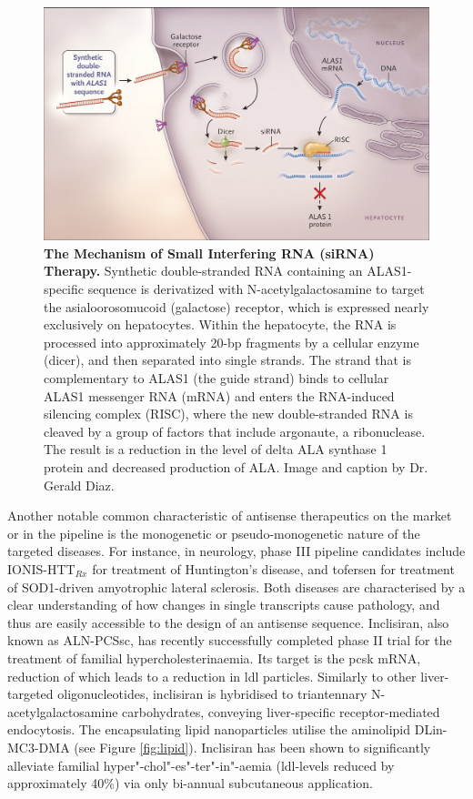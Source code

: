 \begin{figure}[ht]
\includegraphics[width=\textwidth]{figures/pathophys-porphyria-therapy-sirna-nejm-original}
\caption[The Mechanism of Small Interfering RNA (siRNA) Therapy.]{\textbf{The Mechanism of Small Interfering RNA (siRNA) Therapy.} Synthetic double-stranded RNA containing an ALAS1-specific sequence is derivatized with N-acetylgalactosamine to target the asialoorosomucoid (galactose) receptor, which is expressed nearly exclusively on hepatocytes. Within the hepatocyte, the RNA is processed into approximately 20-bp fragments by a cellular enzyme (dicer), and then separated into single strands. The strand that is complementary to ALAS1 (the guide strand) binds to cellular ALAS1 messenger RNA (mRNA) and enters the RNA-induced silencing complex (RISC), where the new double-stranded RNA is cleaved by a group of factors that include argonaute, a ribonuclease. The result is a reduction in the level of delta ALA synthase 1 protein and decreased production of ALA. Image and caption by Dr. Gerald Diaz.\cite{Diaz2018}
\label{fig:pathophys-porphyria}}
\end{figure}

Another notable common characteristic of antisense therapeutics on the market or in the pipeline is the monogenetic or pseudo-monogenetic nature of the targeted diseases. For instance, in neurology, phase III pipeline candidates include IONIS-HTT$_{Rx}$ for treatment of Huntington's disease, and tofersen for treatment of SOD1-driven amyotrophic lateral sclerosis. Both diseases are characterised by a clear understanding of how changes in single transcripts cause pathology, and thus are easily accessible to the design of an antisense sequence. Inclisiran, also known as ALN-PCSsc, has recently successfully completed phase II trial for the treatment of familial hypercholesterinaemia.\cite{Raal2020} Its target is the \ac{pcsk} mRNA, reduction of which leads to a reduction in \ac{ldl} particles. Similarly to other liver-targeted oligonucleotides, inclisiran is hybridised to triantennary N-acetylgalactosamine carbohydrates, conveying liver-specific receptor-mediated endocytosis. The encapsulating lipid nanoparticles utilise the aminolipid DLin-MC3-DMA (see Figure \ref{fig:lipid}).\cite{Jayaraman2012} Inclisiran has been shown to significantly alleviate familial hyper"-chol"-es"-ter"-in"-aemia (\ac{ldl}-levels reduced by approximately 40\%) via only bi-annual subcutaneous application.\cite{Frank-Kamenetsky2008, Fitzgerald2014, Fitzgerald2017, Raal2020}

